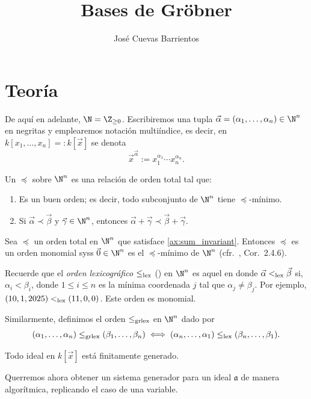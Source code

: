 \documentclass[11pt, reqno]{amsart}
\title{Bases de Gröbner}
\date{\DTMdate{2025-11-05}}
\author{José Cuevas Barrientos}
\begin{document}
\maketitle

\section{Teoría}
De aquí en adelante, $\N = \Z_{\ge 0}$.
Escribiremos una tupla $\vec\alpha = (\alpha_1, \dots, \alpha_n) \in \N^n$ en negritas y emplearemos notación multiíndice, es decir,
en $k[x_1, \dots, x_n] =: k[\vec x]$ se denota
\[
	\vec{x}^{\vec\alpha} := x_1^{\alpha_1} \cdots x_n^{\alpha_n}.
\]
\begin{mydef}
	Un  $\preceq$ sobre $\N^n$ es una relación de orden total tal que:
	\begin{enumerate}[{OM}1., ref=OM\arabic*]
		\item Es un buen orden; es decir, todo subconjunto de $\N^n$ tiene $\preceq$-mínimo.
		\item\label{ax:sum_invariant}
			Si $\vec\alpha \prec \vec\beta$ y $\vec\gamma \in \N^n$, entonces $\vec\alpha + \vec\gamma \prec \vec\beta + \vec\gamma$.
	\end{enumerate}
\end{mydef}
\begin{obs}
	Sea $\preceq$ un orden total en $\N^n$ que satisface \ref{ax:sum_invariant}.
	Entonces $\preceq$ es un orden monomial syss $\vec 0 \in \N^n$ es el $\preceq$-mínimo de $\N^n$
	(cfr.\ \cite{cox:ideals}, Cor.~2.4.6).
\end{obs}
\begin{ex}
	Recuerde que el \emph{orden lexicográfico} $\leq_{\rm lex}$ () en $\N^n$ es aquel en donde $\vec\alpha
	<_{\rm lex} \vec\beta$ si, $\alpha_i < \beta_i$, donde $1 \le i \le n$ es la mínima coordenada $j$ tal que $\alpha_j \ne \beta_j$.
	Por ejemplo, $(10, 1, 2025) <_{\rm lex} (11, 0, 0)$.
	Este orden es monomial.

	Similarmente, definimos el orden $\leq_{\rm grlex}$ en $\N^n$ dado por
	\[
		(\alpha_1, \dots, \alpha_n) \leq_{\rm grlex} (\beta_1, \dots, \beta_n) \iff
		(\alpha_n, \dots, \alpha_1) \leq_{\rm lex} (\beta_n, \dots, \beta_1).
	\]
\end{ex}

\begin{thm}
	Todo ideal en $k[\vec x]$ está finitamente generado.
\end{thm}
Querremos ahora obtener un sistema generador para un ideal $\mathfrak{a}$ de manera algorítmica, replicando el caso de una variable.
\end{document}
